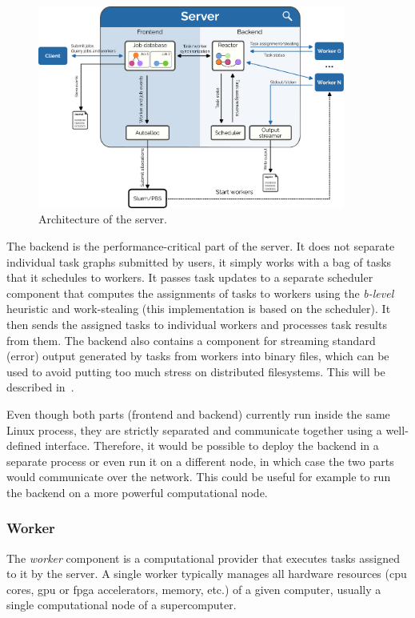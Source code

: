 \begin{figure}[h]
	\centering
	\includegraphics[width=0.9\textwidth]{imgs/hq/server-architecture}
	\caption{Architecture of the \hyperqueue{} server.}
	\label{fig:hq-server-architecture}
\end{figure}

The backend is the performance-critical part of the server. It does not separate individual task
graphs submitted by users, it simply works with a bag of tasks that it schedules to workers. It
passes task updates to a separate scheduler component that computes the assignments of tasks to
workers using the \emph{b-level} heuristic and work-stealing (this implementation is based
on the \rsds{} scheduler). It then sends the assigned tasks to individual workers
and processes task results from them. The backend also contains a component for streaming standard
(error) output generated by tasks from workers into binary files, which can be used to avoid
putting too much stress on distributed filesystems. This will be described
in~.

Even though both parts (frontend and backend) currently run inside the same Linux process, they are
strictly separated and communicate together using a well-defined interface. Therefore, it would be
possible to deploy the backend in a separate process or even run it on a different node, in which
case the two parts would communicate over the network. This could be useful for example to run the
backend on a more powerful computational node.

\subsubsection*{Worker}
The \emph{worker} component is a computational provider that executes tasks assigned to
it by the server. A single worker typically manages all hardware resources (\gls{cpu}
cores, \gls{gpu} or \gls{fpga} accelerators, memory, etc.) of a given
computer, usually a single computational node of a supercomputer.

